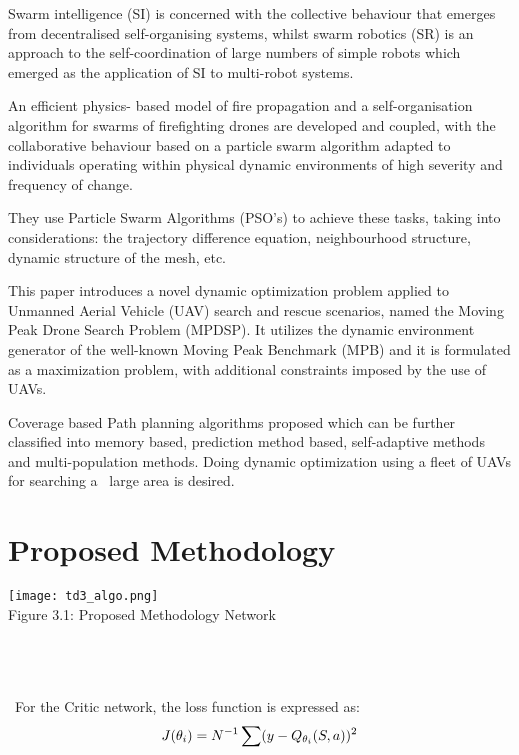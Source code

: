 \documentclass[conference]{IEEEtran}
\begin{document}
Swarm intelligence (SI) is concerned with the collective behaviour that emerges from decentralised self-organising systems, whilst swarm robotics (SR) is an approach to the self-coordination of large numbers of simple robots which emerged as the application of SI to multi-robot systems. 

An efficient physics- based model of fire propagation and a self-organisation algorithm for swarms of firefighting drones are developed and coupled, with the collaborative behaviour based on a particle swarm algorithm adapted to individuals operating within physical dynamic environments of high severity and frequency of change.

They use Particle Swarm Algorithms (PSO’s) to achieve these tasks, taking into considerations: the trajectory difference equation, neighbourhood structure, dynamic structure of the mesh, etc\cite{innocente2019self}.




This paper introduces a novel dynamic optimization problem applied to Unmanned Aerial Vehicle (UAV) search and rescue scenarios, named the Moving Peak Drone Search Problem (MPDSP). It utilizes the dynamic environment generator of the well-known Moving Peak Benchmark (MPB) and it is formulated as a maximization problem, with additional constraints imposed by the use of UAVs. 


Coverage based Path planning algorithms proposed which can be further classified into memory based, prediction method based, self-adaptive methods and multi-population methods. Doing dynamic optimization using a fleet of UAVs for searching a  large area is desired\cite{kyriakakis2021moving}.


\section{Proposed Methodology}

\graphicspath{ {./images/} }
\texttt{[image: td3\_algo.png]}\\
\caption{Figure 3.1: Proposed Methodology Network}\\\\
\\\
For the Critic network, the loss function is expressed as:
\begin{equation}
\label{eq:first}
J(\theta_i) = N^{-1}\sum(y - Q_{\theta_i}(S,a))^2\\
\end{equation}
\end{document}
